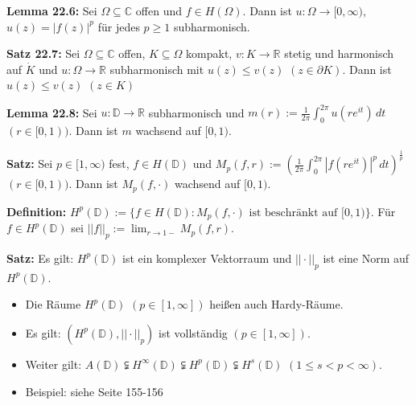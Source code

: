 \documentclass[11pt]{article}
\newcommand{\C}{\mathbb{C}}
\newcommand{\R}{\mathbb{R}}
\newcommand{\D}{\mathbb{D}}
\begin{document}
\textbf{Lemma 22.6:} Sei $\Omega \subseteq \C$ offen und $f \in H(\Omega)$. Dann ist $u \colon \Omega \to [0, \infty)$, $u(z) = |f(z)|^p$ für jedes $p \geq 1$ subharmonisch.

\textbf{Satz 22.7:} Sei $\Omega \subseteq \C$ offen, $K \subseteq \Omega$ kompakt, $v \colon K \to \R$ stetig und harmonisch auf $\dot{K}$ und $u \colon \Omega \to \R$ subharmonisch mit $u(z) \leq v(z)$ $(z \in \partial K)$. Dann ist $u(z) \leq v(z)$ $(z \in K)$

\textbf{Lemma 22.8:} Sei $u \colon \D \to \R$ subharmonisch und $m(r) := \frac{1}{2\pi} \int_0^{2\pi} u(re^{it}) \, dt$ $(r \in [0,1))$. Dann ist $m$ wachsend auf $[0,1)$.

\textbf{Satz:} Sei $p \in [1, \infty)$ fest, $f \in H(\D)$ und $M_p(f,r) := (\frac{1}{2\pi} \int_0^{2\pi} |f(re^{it})|^p \, dt)^{\frac{1}{p}}$ $(r \in [0,1))$. Dann ist $M_p(f, \cdot)$ wachsend auf $[0,1)$.

\textbf{Definition:} $H^p(\D) := \{ f \in H(\D)\colon M_p(f,\cdot) \text{ ist beschränkt auf } [0,1)\}$. Für $f \in H^p(\D)$ sei $||f||_p := \lim_{r \to 1-} M_p(f,r)$.

\textbf{Satz:} Es gilt: $H^p(\D)$ ist ein komplexer Vektorraum und $||\cdot||_p$ ist eine Norm auf $H^p(\D)$.
\vspace{-0.6cm}
\begin{itemize}
\item Die Räume $H^p(\D)$ $(p \in [1,\infty])$ heißen auch Hardy-Räume. \vspace{-0.2cm}
\item Es gilt: $(H^p(\D), ||\cdot||_p)$ ist vollständig $(p \in [1, \infty])$. \vspace{-0.2cm}
\item Weiter gilt: $A(\D) \subsetneqq H^\infty(\D) \subsetneqq H^p(\D) \subsetneqq H^s(\D)$ $(1 \leq s < p < \infty)$. \vspace{-0.2cm}
\item Beispiel: siehe Seite 155-156
\end{itemize}
\vspace{-0.6cm}
\end{document}
